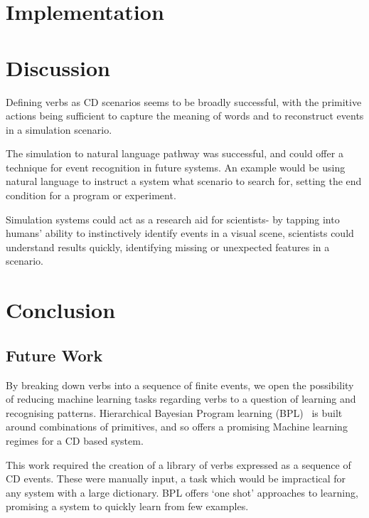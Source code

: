 \documentclass{article}
\begin{document}
    \section{Implementation}
    


    \section{Discussion}
    Defining verbs as CD scenarios seems to be broadly successful, with the primitive actions being sufficient to capture the meaning of words and to reconstruct events in a simulation scenario.

    The simulation to natural language pathway was successful, and could offer a technique for event recognition in future systems. An example would be using natural language to instruct a system what scenario to search for, setting the end condition for a program or experiment.

    Simulation systems could act as a research aid for scientists- by tapping into humans' ability to instinctively identify events in a visual scene, scientists could understand results quickly, identifying missing or unexpected features in a scenario.

    \section{Conclusion}
    \subsection{Future Work}
    By breaking down verbs into a sequence of finite events, we open the possibility of reducing machine learning tasks regarding verbs to a question of learning and recognising patterns. Hierarchical Bayesian Program learning (BPL)~\cite{one-shot-learning} is built around combinations of primitives, and so offers a promising Machine learning regimes for a CD based system.
    
    This work required the creation of a library of verbs expressed as a sequence of CD events. These were manually input, a task which would be impractical for any system with a large dictionary. BPL offers `one shot' approaches to learning, promising a system to quickly learn from few examples.
    
\end{document}
